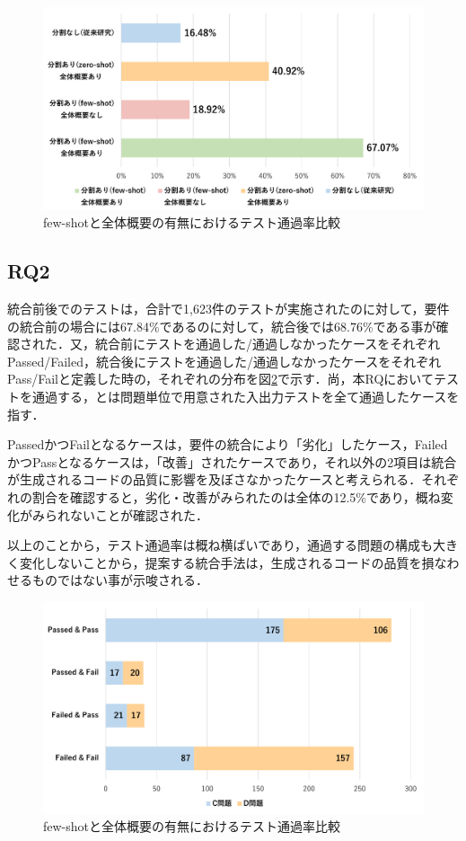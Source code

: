 \documentclass[submit,techrep,noauthor]{ipsj}
\begin{document}
\begin{figure}[t]
    \centering
    \includegraphics[width=1.0\linewidth]{./Toyoshima_fig/SIGSE_fig1.pdf}
    \caption{few-shotと全体概要の有無におけるテスト通過率比較\protect\footnotemark}
    \label{ses2025}
\end{figure}

\subsection{RQ2}
統合前後でのテストは，合計で1,623件のテストが実施されたのに対して，要件の統合前の場合には67.84\%であるのに対して，統合後では68.76\%である事が確認された．又，統合前にテストを通過した/通過しなかったケースをそれぞれPassed/Failed，統合後にテストを通過した/通過しなかったケースをそれぞれPass/Failと定義した時の，それぞれの分布を図\ref{rq2_1}で示す．尚，本RQにおいてテストを通過する，とは問題単位で用意された入出力テストを全て通過したケースを指す．

PassedかつFailとなるケースは，要件の統合により「劣化」したケース，FailedかつPassとなるケースは，「改善」されたケースであり，それ以外の2項目は統合が生成されるコードの品質に影響を及ぼさなかったケースと考えられる．それぞれの割合を確認すると，劣化・改善がみられたのは全体の12.5\%であり，概ね変化がみられないことが確認された．

以上のことから，テスト通過率は概ね横ばいであり，通過する問題の構成も大きく変化しないことから，提案する統合手法は，生成されるコードの品質を損なわせるものではない事が示唆される．

\begin{figure}[t]
    \centering
    \includegraphics[width=1.0\linewidth]{./Toyoshima_fig/SIGSE_PF.pdf}
    \caption{few-shotと全体概要の有無におけるテスト通過率比較\protect\footnotemark}
    \label{rq2_1}
\end{figure}
\end{document}
